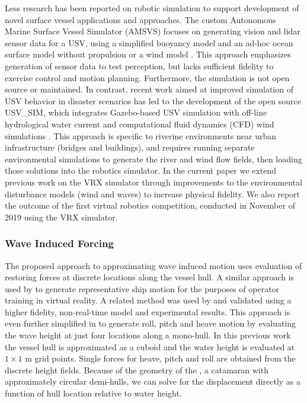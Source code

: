 \documentclass[utf8]{frontiersSCNS} %
\begin{document}
Less research has been reported on robotic simulation to support development of novel surface vessel applications and approaches.  The custom Autonomous Marine Surface Vessel Simulator (AMSVS) focuses on generating vision and lidar sensor data for a USV, using a simplified buoyancy model and an ad-hoc ocean surface model without propulsion or a wind model \citep{smith19high}.  This approach emphasizes generation of sensor data to test perception, but lacks sufficient fidelity to exercise control and motion planning.  Furthermore, the simulation is not open source or maintained. In contrast, recent work aimed at improved simulation of USV behavior in disaster scenarios has led to the development of the open source USV\_SIM, which integrates Gazebo-based USV simulation with off-line hydrological water current and computational fluid dynamics (CFD) wind simulations \citep{paravisi2019unmanned}.  This approach is specific to riverine environments near urban infrastructure (bridges and buildings), and requires running separate environmental simulations to generate the river and wind flow fields, then loading those solutions into the robotics simulator.  In the current paper we extend previous work on the VRX simulator \citep{bingham19toward} through improvements to the environmental disturbance models (wind and waves) to increase physical fidelity. We also report the outcome of the first virtual robotics competition, conducted in November of 2019 using the VRX simulator.

\subsubsection{Wave Induced Forcing}
The proposed approach to approximating wave induced motion uses evaluation of restoring forces at discrete locations along the vessel hull.  A similar approach is used by \citet{ueng08ship} to generate representative ship motion for the purposes of operator training in virtual reality.  A related method was used by \citet{sandaruwan12user} and validated using a higher fidelity, non-real-time model and experimental results.  This approach is even further simplified in \citet{yeo12simulating} to generate roll, pitch and heave motion by evaluating the wave height at just four locations along a mono-hull.   In this previous work the vessel hull is approximated as a cuboid and the water height is evaluated at $1 \times  1$ m grid points.  Single forces for heave, pitch and roll are obtained from the discrete height fields. Because of the geometry of the \wamv{}, a catamaran with approximately circular demi-hulls, we can solve for the displacement directly as a function of hull location relative to water height.  
\end{document}
